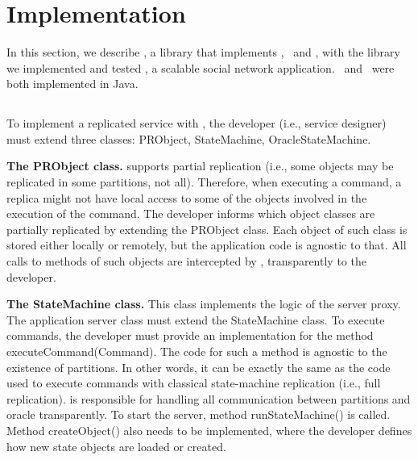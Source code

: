 \section{Implementation}
\label{sec:implementation}

In this section, we describe \libname{}, a library that implements \dynastar, \ssmr\ and \dssmr, with the library we
implemented and tested \appname{}, a scalable social network application. \libname\ and \appname\ were both
implemented in Java.

\subsection{\libname}

To implement a replicated service with \libname{}, the developer (i.e., service designer) must extend three classes: PRObject, StateMachine, OracleStateMachine.

\textbf{The PRObject class.} \libname{} supports partial replication (i.e., some objects may be replicated in some partitions, not all). Therefore, when executing a command, a replica might not have local access to some of the objects involved in the execution of the command. The developer informs \libname{} which object classes are partially replicated by extending the PRObject class. Each object of such class is stored either locally or remotely, but the application code is agnostic to that. All calls to methods of such objects are intercepted by \libname{}, transparently to the developer.


\textbf{The StateMachine class.} This class implements the logic of the server proxy. The application server class must extend the StateMachine class. To execute commands, the developer must provide an implementation for the method executeCommand(Command). The code for such a method is agnostic to the existence of partitions. In other words, it can be exactly the same as the code used to execute commands with classical state-machine replication (i.e., full replication). \libname{} is responsible for handling all communication between partitions and oracle transparently. To start the server, method runStateMachine() is called. Method createObject() also needs to be implemented, where the developer defines how new state objects are loaded or created.


